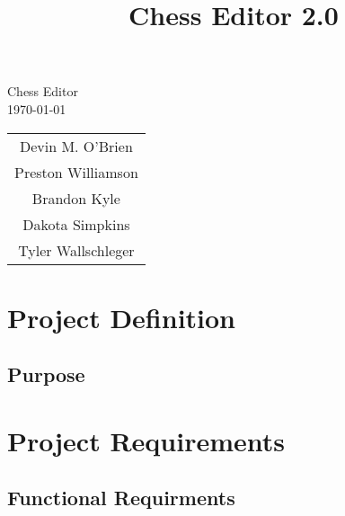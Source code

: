 \documentclass{article}
\title{Chess Editor 2.0}
\begin{document}
\begin{titlepage}
\begin{center}
\vspace{1cm}
\huge Chess Editor\\
\normalsize
\vspace{1cm}
\today\\
\vspace{1cm}
\begin{tabular}{c}
Devin M. O'Brien \\
Preston Williamson\\
Brandon Kyle\\
Dakota Simpkins\\
Tyler Wallschleger
\end{tabular}
\end{center}
\end{titlepage}
\section{Project Definition}
\subsection{Purpose}

\newpage
\section{Project Requirements}

\subsection{Functional Requirments}
\end{document}
